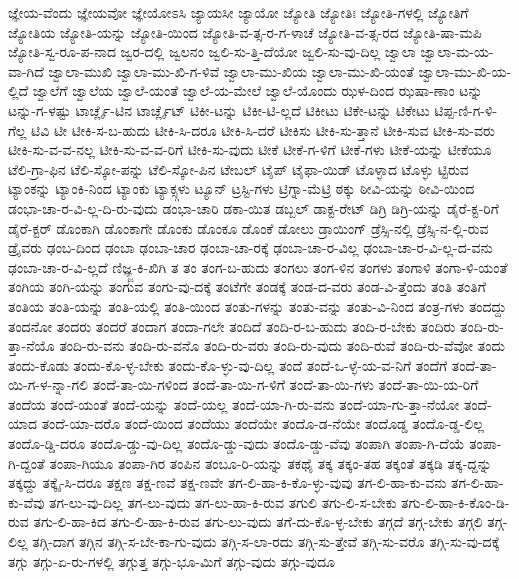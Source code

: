 {ಜ್ಞೇಯ-ವೆಂದು
ಜ್ಞೇಯವೋ
ಜ್ಞೇಯೋಽಸಿ
ಜ್ಯಾಯಸೀ
ಜ್ಯಾಯೋ
ಜ್ಯೋತಿ
ಜ್ಯೋತಿಃ
ಜ್ಯೋತಿ-ಗಳಲ್ಲಿ
ಜ್ಯೋತಿಗೆ
ಜ್ಯೋತಿಯ
ಜ್ಯೋತಿ-ಯನ್ನು
ಜ್ಯೋತಿ-ಯಿಂದ
ಜ್ಯೋತಿ-ವ-ತ್ಸ-ರ-ಗ-ಳಾಚೆ
ಜ್ಯೋತಿ-ವ-ತ್ಸ-ರದ
ಜ್ಯೋತಿ-ಷಾ-ಮಪಿ
ಜ್ಯೋತಿ-ಸ್ವ-ರೂ-ಪ-ನಾದ
ಜ್ವರ-ದಲ್ಲಿ
ಜ್ವಲನಂ
ಜ್ವಲಿ-ಸು-ತ್ತಿ-ದೆಯೋ
ಜ್ವಲಿ-ಸು-ವು-ದಿಲ್ಲ
ಜ್ವಾಲಾ
ಜ್ವಾಲಾ-ಮ-ಯ-ವಾ-ಗಿದೆ
ಜ್ವಾಲಾ-ಮುಖಿ
ಜ್ವಾಲಾ-ಮು-ಖಿ-ಗ-ಳಿವೆ
ಜ್ವಾಲಾ-ಮು-ಖಿಯ
ಜ್ವಾಲಾ-ಮು-ಖಿ-ಯಂತೆ
ಜ್ವಾಲಾ-ಮು-ಖಿ-ಯ-ಲ್ಲಿದೆ
ಜ್ವಾಲೆಗೆ
ಜ್ವಾಲೆಯ
ಜ್ವಾಲೆ-ಯಂತೆ
ಜ್ವಾಲೆ-ಯ-ಮೇಲೆ
ಜ್ವಾಲೆ-ಯೊಂದು
ಝಳ-ದಿಂದ
ಝಷಾ-ಣಾಂ
ಟನ್ನು
ಟನ್ನು-ಗ-ಳಷ್ಟು
ಟಾರ್ಚ್ಲೈ-ಟಿನ
ಟಾರ್ಚ್ಲೈಟ್
ಟಿಕೀ-ಟನ್ನು
ಟಿಕೀ-ಟಿ-ಲ್ಲದೆ
ಟಿಕೀಟು
ಟಿಕೇ-ಟನ್ನು
ಟಿಕೇಟು
ಟಿಪ್ಪ-ಣಿ-ಗ-ಳಿ-ಗೆಲ್ಲ
ಟಿವಿ
ಟೀ
ಟೀಕಿ-ಸ-ಬ-ಹುದು
ಟೀಕಿ-ಸಿ-ದರೂ
ಟೀಕಿ-ಸಿ-ದರೆ
ಟೀಕಿಸು
ಟೀಕಿ-ಸು-ತ್ತಾನೆ
ಟೀಕಿ-ಸುವ
ಟೀಕಿ-ಸು-ವರು
ಟೀಕಿ-ಸು-ವ-ವ-ನಲ್ಲ
ಟೀಕಿ-ಸು-ವ-ವ-ರಿಗೆ
ಟೀಕಿ-ಸು-ವುದು
ಟೀಕೆ
ಟೀಕೆ-ಗ-ಳಿಗೆ
ಟೀಕೆ-ಗಳು
ಟೀಕೆ-ಯನ್ನು
ಟೀಕೆಯೂ
ಟೆಲಿ-ಗ್ರಾ-ಫಿನ
ಟೆಲಿ-ಸ್ಕೋ-ಪನ್ನು
ಟೆಲಿ-ಸ್ಕೋ-ಪಿನ
ಟೇಬಲ್
ಟೈಪ್
ಟೈಫಾ-ಯಿಡ್
ಟೊಳ್ಳಾದ
ಟೊಳ್ಳು
ಟ್ಟಿರುವ
ಟ್ಯಾಂಕನ್ನು
ಟ್ಯಾಂಕಿ-ನಿಂದ
ಟ್ಯಾಂಕು
ಟ್ಯಾಕ್ಸ್ಗಳು
ಟ್ಯೂನ್
ಟ್ರಸ್ಟಿ-ಗಳು
ಟ್ರಿಗ್ನಾ-ಮೆಟ್ರಿ
ಠಕ್ಕು
ಠೀವಿ-ಯನ್ನು
ಠೀವಿ-ಯಿಂದ
ಡಂಭಾ-ಚಾ-ರ-ವಿ-ಲ್ಲ-ದಿ-ರು-ವುದು
ಡಂಭಾ-ಚಾರಿ
ಡಕಾ-ಯಿತ
ಡಬ್ಬಲ್
ಡಾಕ್ಟ-ರೇಟ್
ಡಿಗ್ರಿ
ಡಿಗ್ರಿ-ಯನ್ನು
ಡೈರೆ-ಕ್ಟ-ರಿಗೆ
ಡೈರೆ-ಕ್ಟರ್
ಡೊಂಕಾಗಿ
ಡೊಂಕಾಗೇ
ಡೊಂಕು
ಡೊಂಕೂ
ಡೊಂಕೆ
ಡೋಲು
ಡ್ರಾಯಿಂಗ್
ಡ್ರೆಸ್ಸಿ-ನಲ್ಲಿ
ಡ್ರೆಸ್ಸಿ-ನ-ಲ್ಲಿ-ರುವ
ಡ್ರೈವರು
ಢಂಬ-ದಿಂದ
ಢಂಬಾ
ಢಂಬಾ-ಚಾರ
ಢಂಬಾ-ಚಾ-ರಕ್ಕೆ
ಢಂಬಾ-ಚಾ-ರ-ವಿಲ್ಲ
ಢಂಬಾ-ಚಾ-ರ-ವಿ-ಲ್ಲ-ದ-ವನು
ಢಂಬಾ-ಚಾ-ರ-ವಿ-ಲ್ಲದೆ
ಣಿಜ್ಞ್ಜ-ಕಿ-ಖಿಗಿ
ತ
ತಂ
ತಂಗ-ಬ-ಹುದು
ತಂಗಲು
ತಂಗ-ಳಿನ
ತಂಗಳು
ತಂಗಾಳಿ
ತಂಗಾ-ಳಿ-ಯಂತೆ
ತಂಗಿಯ
ತಂಗಿ-ಯನ್ನು
ತಂಗುವ
ತಂಗು-ವು-ದಕ್ಕೆ
ತಂಟೆಗೇ
ತಂಡಕ್ಕೆ
ತಂಡ-ದ-ವರು
ತಂಡ-ವಿ-ತ್ತೆಂದು
ತಂತಿ
ತಂತಿಗೆ
ತಂತಿಯ
ತಂತಿ-ಯನ್ನು
ತಂತಿ-ಯಲ್ಲಿ
ತಂತಿ-ಯಿಂದ
ತಂತು-ಗಳನ್ನು
ತಂತು-ವನ್ನು
ತಂತು-ವಿ-ನಿಂದ
ತಂತ್ರ-ಗಳು
ತಂದದ್ದು
ತಂದನೋ
ತಂದರು
ತಂದರೆ
ತಂದಾಗ
ತಂದಾ-ಗಲೇ
ತಂದಿದೆ
ತಂದಿ-ರ-ಬ-ಹುದು
ತಂದಿ-ರ-ಬೇಕು
ತಂದಿರು
ತಂದಿ-ರು-ತ್ತಾ-ನೆಯೊ
ತಂದಿ-ರು-ವನು
ತಂದಿ-ರು-ವನೊ
ತಂದಿ-ರು-ವರು
ತಂದಿ-ರು-ವುದು
ತಂದಿ-ರುವೆ
ತಂದಿ-ರು-ವೆವೋ
ತಂದು
ತಂದು-ಕೊಡು
ತಂದು-ಕೊ-ಳ್ಳ-ಬೇಕು
ತಂದು-ಕೊ-ಳ್ಳು-ವು-ದಿಲ್ಲ
ತಂದೆ
ತಂದೆ-ಒ-ಳ್ಳೆ-ಯ-ವ-ನಿಗೆ
ತಂದೆಗೆ
ತಂದೆ-ತಾ-ಯಿ-ಗ-ಳ-ನ್ನಾ-ಗಲಿ
ತಂದೆ-ತಾ-ಯಿ-ಗಳಿಂದ
ತಂದೆ-ತಾ-ಯಿ-ಗ-ಳಿಗೆ
ತಂದೆ-ತಾ-ಯಿ-ಗಳು
ತಂದೆ-ತಾ-ಯಿ-ಯ-ರಿಗೆ
ತಂದೆಯ
ತಂದೆ-ಯಂತೆ
ತಂದೆ-ಯನ್ನು
ತಂದೆ-ಯಲ್ಲ
ತಂದೆ-ಯಾ-ಗಿ-ರು-ವನು
ತಂದೆ-ಯಾ-ಗು-ತ್ತಾ-ನೆಯೋ
ತಂದೆ-ಯಾದ
ತಂದೆ-ಯಾ-ದರೊ
ತಂದೆ-ಯಿಂದ
ತಂದೆಯು
ತಂದೆಯೇ
ತಂದೊ-ಡ-ನೆಯೇ
ತಂದೊಡ್ಡ
ತಂದೊ-ಡ್ಡ-ಲಿಲ್ಲ
ತಂದೊ-ಡ್ಡಿ-ದರೂ
ತಂದೊ-ಡ್ಡು-ವು-ದಿಲ್ಲ
ತಂದೊ-ಡ್ಡು-ವುದು
ತಂದೊ-ಡ್ಡು-ವೆವು
ತಂಪಾಗಿ
ತಂಪಾ-ಗಿ-ದೆಯೆ
ತಂಪಾ-ಗಿ-ದ್ದಂತೆ
ತಂಪಾ-ಗಿಯೂ
ತಂಪಾ-ಗಿರ
ತಂಪಿನ
ತಂಬೂ-ರಿ-ಯನ್ನು
ತಕಥೈ
ತಕ್ಕ
ತಕ್ಕಂ-ತಹ
ತಕ್ಕಂತೆ
ತಕ್ಕಡಿ
ತಕ್ಕ-ದ್ದನ್ನು
ತಕ್ಕದ್ದು
ತಕ್ಕೈ-ಸಿ-ದರೂ
ತಕ್ಷಣ
ತಕ್ಷ-ಣವೆ
ತಕ್ಷ-ಣವೇ
ತಗ-ಲಿ-ಹಾ-ಕಿ-ಕೊ-ಳ್ಳು-ವುವು
ತಗ-ಲಿ-ಹಾ-ಕು-ವನು
ತಗ-ಲಿ-ಹಾ-ಕು-ವೆವು
ತಗ-ಲು-ವು-ದಿಲ್ಲ
ತಗ-ಲು-ವುದು
ತಗ-ಲು-ಹಾ-ಕಿ-ರುವ
ತಗುಲಿ
ತಗು-ಲಿ-ಸ-ಬೇಕು
ತಗು-ಲಿ-ಹಾ-ಕಿ-ಕೊಂ-ಡಿ-ರುವ
ತಗು-ಲಿ-ಹಾ-ಕಿದ
ತಗು-ಲಿ-ಹಾ-ಕಿ-ರುವ
ತಗು-ಲು-ವುದು
ತಗೆ-ದು-ಕೊ-ಳ್ಳ-ಬೇಕು
ತಗ್ಗದೆ
ತಗ್ಗ-ಬೇಕು
ತಗ್ಗಲಿ
ತಗ್ಗ-ಲಿಲ್ಲ
ತಗ್ಗಿ-ದಾಗ
ತಗ್ಗಿನ
ತಗ್ಗಿ-ಸ-ಬೇ-ಕಾ-ಗು-ವುದು
ತಗ್ಗಿ-ಸ-ಲಾ-ರದು
ತಗ್ಗಿ-ಸು-ತ್ತೇವೆ
ತಗ್ಗಿ-ಸು-ವರೊ
ತಗ್ಗಿ-ಸು-ವು-ದಕ್ಕೆ
ತಗ್ಗು
ತಗ್ಗು-ಏ-ರು-ಗಳಲ್ಲಿ
ತಗ್ಗುತ್ತ
ತಗ್ಗು-ಭೂ-ಮಿಗೆ
ತಗ್ಗು-ವುದು
ತಗ್ಗು-ವುದೂ
}
